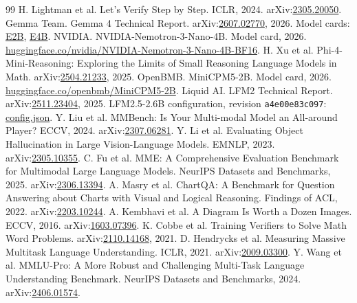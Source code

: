\begin{thebibliography}{99}
 H. Lightman et al. Let's Verify Step by Step. ICLR, 2024. arXiv:\href{https://arxiv.org/abs/2305.20050}{2305.20050}.
 Gemma Team. Gemma 4 Technical Report. arXiv:\href{https://arxiv.org/abs/2607.02770}{2607.02770}, 2026. Model cards: \href{https://huggingface.co/google/gemma-4-E2B-it}{E2B}, \href{https://huggingface.co/google/gemma-4-E4B-it}{E4B}.
 NVIDIA. NVIDIA-Nemotron-3-Nano-4B. Model card, 2026. \href{https://huggingface.co/nvidia/NVIDIA-Nemotron-3-Nano-4B-BF16}{huggingface.co/nvidia/NVIDIA-Nemotron-3-Nano-4B-BF16}.
 H. Xu et al. Phi-4-Mini-Reasoning: Exploring the Limits of Small Reasoning Language Models in Math. arXiv:\href{https://arxiv.org/abs/2504.21233}{2504.21233}, 2025.
 OpenBMB. MiniCPM5-2B. Model card, 2026. \href{https://huggingface.co/openbmb/MiniCPM5-2B}{huggingface.co/openbmb/MiniCPM5-2B}.
 Liquid AI. LFM2 Technical Report. arXiv:\href{https://arxiv.org/abs/2511.23404}{2511.23404}, 2025. LFM2.5-2.6B configuration, revision \texttt{a4e00e83c097}: \href{https://huggingface.co/LiquidAI/LFM2.5-2.6B/blob/a4e00e83c0979ee9deb88d04b6360599fa956656/config.json}{config.json}.
 Y. Liu et al. MMBench: Is Your Multi-modal Model an All-around Player? ECCV, 2024. arXiv:\href{https://arxiv.org/abs/2307.06281}{2307.06281}.
 Y. Li et al. Evaluating Object Hallucination in Large Vision-Language Models. EMNLP, 2023. arXiv:\href{https://arxiv.org/abs/2305.10355}{2305.10355}.
 C. Fu et al. MME: A Comprehensive Evaluation Benchmark for Multimodal Large Language Models. NeurIPS Datasets and Benchmarks, 2025. arXiv:\href{https://arxiv.org/abs/2306.13394}{2306.13394}.
 A. Masry et al. ChartQA: A Benchmark for Question Answering about Charts with Visual and Logical Reasoning. Findings of ACL, 2022. arXiv:\href{https://arxiv.org/abs/2203.10244}{2203.10244}.
 A. Kembhavi et al. A Diagram Is Worth a Dozen Images. ECCV, 2016. arXiv:\href{https://arxiv.org/abs/1603.07396}{1603.07396}.
 K. Cobbe et al. Training Verifiers to Solve Math Word Problems. arXiv:\href{https://arxiv.org/abs/2110.14168}{2110.14168}, 2021.
 D. Hendrycks et al. Measuring Massive Multitask Language Understanding. ICLR, 2021. arXiv:\href{https://arxiv.org/abs/2009.03300}{2009.03300}.
 Y. Wang et al. MMLU-Pro: A More Robust and Challenging Multi-Task Language Understanding Benchmark. NeurIPS Datasets and Benchmarks, 2024. arXiv:\href{https://arxiv.org/abs/2406.01574}{2406.01574}.

\end{thebibliography}
